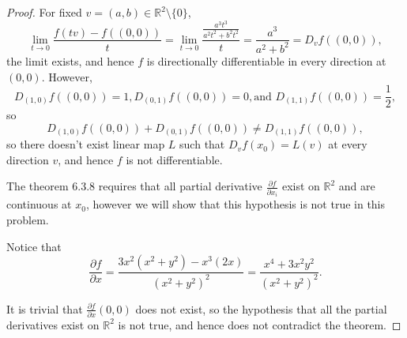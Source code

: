\begin{proof}
    For fixed $v = (a,b) \in \mathbb{R}^2 \setminus \{0\}$,
    \[
        \lim_{t \to 0} \frac{f(tv) - f((0,0))}{t} = \lim_{t \to 0} \frac{\frac{a^3t^3}{a^2t^2+b^2t^2}}{t} = \frac{a^3}{a^2+b^2} = D_vf((0,0)),
    \]
    the limit exists, and hence $f$ is directionally differentiable in every direction at $(0,0)$. However, 
    \[
        D_{(1,0)} f((0,0)) = 1, D_{(0,1)} f((0,0)) = 0, \text{and } D_{(1,1)} f((0,0)) = \frac{1}{2},
    \]
    so 
    \[
        D_{(1,0)} f((0,0)) + D_{(0,1)} f((0,0)) \ne D_{(1,1)} f((0,0)),
    \]
    so there doesn't exist linear map $L$ such that $D_vf(x_0) = L(v)$ at every direction $v$, and hence $f$ is not differentiable.

    The theorem 6.3.8 requires that all partial derivative $\frac{\partial f}{\partial x_i}$ exist on $\mathbb{R}^2$ and are continuous at $x_0$, however we will show that this hypothesis is not true in this problem.

    Notice that 
    \[
        \frac{\partial f}{\partial x} = \frac{3x^2(x^2+y^2) - x^3(2x)}{(x^2+y^2)^2} = \frac{x^4+3x^2y^2}{(x^2+y^2)^2}.
    \]

    It is trivial that $\frac{\partial f}{\partial x}(0,0)$ does not exist, so the hypothesis that all the partial derivatives exist on $\mathbb{R}^2$ is not true, and hence does not contradict the theorem.
    

\end{proof}

